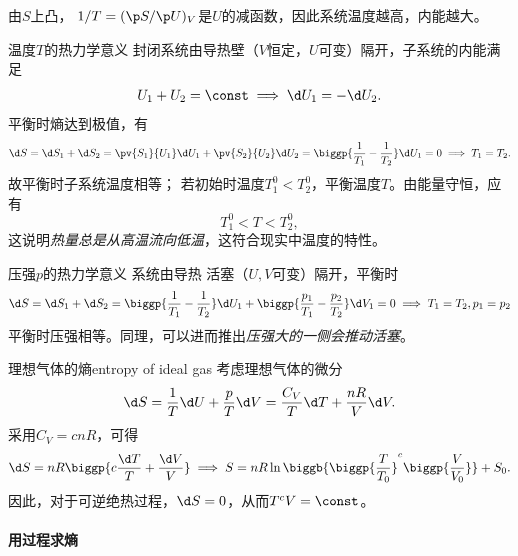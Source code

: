 

\begin{corollary}
	由$S$上凸，
	$1/T=(\p S/\p U)_V$是$U$的减函数，因此系统温度越高，内能越大。
\end{corollary}

\begin{example}
	{温度$T$的热力学意义}{}
	封闭系统由导热壁（$V$恒定，$U$可变）隔开，子系统的内能满足
	\[
		U_1+U_2=\const\implies\d U_1=-\d U_2.
	\]
	平衡时熵达到极值，有
	\[
		\d S=\d S_1+\d S_2=\pv{S_1}{U_1}\d U_1+\pv{S_2}{U_2}\d U_2=\biggp{\frac1{T_1}-\frac1{T_2}}\d U_1=0\implies T_1=T_2.
	\]
	故平衡时子系统温度相等；
	若初始时温度$T_1^0<T_2^0$，平衡温度$T$。由能量守恒，应有
	\[
		T_1^0<T<T_2^0,
	\]
	这说明\textit{热量总是从高温流向低温}，这符合现实中温度的特性。
\end{example}

\begin{example}
	{压强$p$的热力学意义}{}
	系统由导热
	活塞（$U,V$可变）隔开，平衡时
	\[
		\d S=\d S_1+\d S_2=\biggp{\frac1{T_1}-\frac1{T_2}}\d U_1+\biggp{\frac{p_1}{T_1}-\frac{p_2}{T_2}}\d V_1=0\implies T_1=T_2,p_1=p_2
	\]
	平衡时压强相等。同理，可以进而推出\textit{压强大的一侧会推动活塞}。
\end{example}

\begin{example}
	{理想气体的熵}{entropy of ideal gas}
	考虑理想气体的微分
	\[
		\d S=\frac1T\d U+\frac pT\d V=\frac{C_V}T\d T+\frac{nR}V\d V.
	\]
	采用$C_V=cnR$，可得
	\[
		\d S=nR\biggp{c\frac{\d T}T+\frac{\d V}V}\implies S=nR\ln\biggb{\biggp{\frac{T}{T_0}}^c\biggp{\frac{V}{V_0}}}+S_0.
	\]
	因此，对于可逆绝热过程，$\d S=0$，从而$T^cV=\const$。	
\end{example}

\paragraph{用过程求熵}

